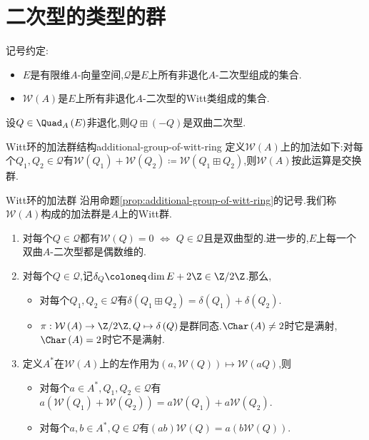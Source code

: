 \section{二次型的类型的群}

记号约定:
\begin{itemize}
	\item $E$是有限维$A$-向量空间,$\mathcal{Q}$是$E$上所有非退化$A$-二次型组成的集合.
	\item $\mathcal{W}\left(A\right)$是$E$上所有非退化$A$-二次型的Witt类组成的集合.
\end{itemize}


\begin{lemma}{}{}
	设$Q\in\Quad_{A}\left(E\right)$非退化,则$Q\boxplus\left(-Q\right)$是双曲二次型.
\end{lemma}

\begin{proposition}{Witt环的加法群结构}{additional-group-of-witt-ring}
	定义$\mathcal{W}\left(A\right)$上的加法如下:对每个$Q_{1},Q_{2}\in\mathcal{Q}$有$\mathcal{W}\left(Q_{1}\right)+\mathcal{W}\left(Q_{2}\right)\coloneq\mathcal{W}\left(Q_{1}\boxplus Q_{2}\right)$,则$\mathcal{W}\left(A\right)$按此运算是交换群.
\end{proposition}

\begin{definition}{Witt环的加法群}{}
	沿用命题\ref{prop:additional-group-of-witt-ring}的记号.我们称$\mathcal{W}\left(A\right)$构成的加法群是$A$上的Witt群.
\end{definition}

\begin{remark}{}{}
	\begin{enumerate}
		\item 对每个$Q\in\mathcal{Q}$都有$\mathcal{W}\left(Q\right)=0$ $\iff$ $Q\in\mathcal{Q}$且是双曲型的.进一步的,$E$上每一个双曲$A$-二次型都是偶数维的.
		\item 对每个$Q\in\mathcal{Q}$,记$\delta_{Q}\coloneq\dim E+2\Z\in\Z/2\Z$.那么,
		\begin{itemize}
			\item 对每个$Q_{1},Q_{2}\in\mathcal{Q}$有$\delta\left(Q_{1}\boxplus Q_{2}\right)=\delta\left(Q_{1}\right)+\delta\left(Q_{2}\right)$.
			\item $\pi:\mathcal{W}\left(A\right)\to\Z/2\Z,Q\mapsto\delta\left(Q\right)$是群同态.$\Char\left(A\right)\neq 2$时它是满射,$\Char\left(A\right)=2$时它不是满射.
		\end{itemize}
		\item 定义$A^{\ast}$在$\mathcal{W}\left(A\right)$上的左作用为$\left(a,\mathcal{W}\left(Q\right)\right)\mapsto\mathcal{W}\left(aQ\right)$,则
		\begin{itemize}
			\item 对每个$a\in A^{\ast},Q_{1},Q_{2}\in\mathcal{Q}$有$a\left(\mathcal{W}\left(Q_{1}\right)+\mathcal{W}\left(Q_{2}\right)\right)=a\mathcal{W}\left(Q_{1}\right)+a\mathcal{W}\left(Q_{2}\right)$.
			\item 对每个$a,b\in A^{\ast},Q\in\mathcal{Q}$有$\left(ab\right)\mathcal{W}\left(Q\right)=a\left(b\mathcal{W}\left(Q\right)\right)$.
		\end{itemize}
	\end{enumerate}
\end{remark}

